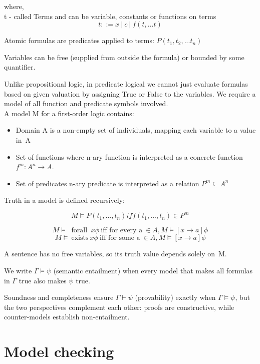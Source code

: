 where,\\ 
t - called Terms and can be variable, constants or functions on terms  \[ t ::= x\ |\ c\ |\ f(t,...t) \]

Atomic formulas are predicates applied to terms: $P(t_1,t_2,...t_n) $

Variables can be free (supplied from outside the formula) or bounded by some quantifier.

Unlike propositional logic, in predicate logical we cannot just evaluate formulas based on given valuation by assigning True or False to the variables.  
We require a model of all function and predicate symbols involved.\\ 
A model M for a first‑order logic contains: 
\begin{itemize}
    \item Domain A is a non‑empty set of individuals, mapping each variable to a value in A
    \item Set of functions where n-ary function is interpreted as a concrete function $f^m : A^n \rightarrow A$.
    \item Set of predicates n-ary predicate is interpreted as a relation $P^m \subseteq A^n $ 
\end{itemize}

Truth in a model is defined recursively:

\[M \models P(t_1,...,t_n) iff (t_1,...,t_n) \in P^m \]

\[M\models\ \text{ forall }\ x\phi\ \text{iff for every a} \ \in A, M \models [x \rightarrow a ] \phi \]
\[M\models\ \text{exists} \ x\phi \ \text{iff for some a} \  \in A, M \models [x \rightarrow a ] \phi \]

A sentence has no free variables, so its truth value depends solely on M.  

We write $\Gamma\models\psi$ (semantic entailment) when every model that makes all formulas in $\Gamma$ true also makes $\psi $ true. 

Soundness and completeness ensure $\Gamma\vdash\psi$ (provability) exactly when $\Gamma\models\psi$,
but the two perspectives complement each other: proofs are constructive, while counter‑models establish non‑entailment.



\section{Model checking}


